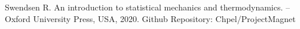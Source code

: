 \begin{thebibliography}{9}
 Swendsen R. An introduction to statistical mechanics and thermodynamics. – Oxford University Press, USA, 2020.
 Github Repository: Chpel/ProjectMagnet
\end{thebibliography}